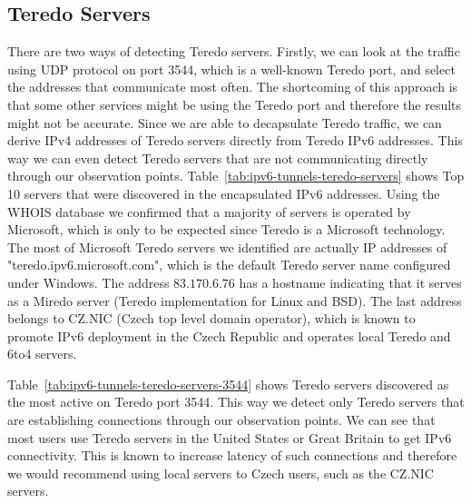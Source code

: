 \subsection{Teredo Servers}
There are two ways of detecting Teredo servers. Firstly, we can look at the traffic using UDP protocol on port 3544, which is a well-known Teredo port, and select the addresses that communicate most often. The shortcoming of this approach is that some other services might be using the Teredo port and therefore the results might not be accurate. Since we are able to decapsulate Teredo traffic, we can derive IPv4 addresses of Teredo servers directly from Teredo IPv6 addresses. This way we can even detect Teredo servers that are not communicating directly through our observation points. Table~\ref{tab:ipv6-tunnels-teredo-servers} shows Top 10 servers that were discovered in the encapsulated IPv6 addresses. Using the WHOIS database we confirmed that a majority of servers is operated by Microsoft, which is only to be expected since Teredo is a Microsoft technology. The most of Microsoft Teredo servers we identified are actually IP addresses of "teredo.ipv6.microsoft.com", which is the default Teredo server name configured under Windows. The address $83.170.6.76$ has a hostname indicating that it serves as a Miredo server (Teredo implementation for Linux and BSD). The last address belongs to CZ.NIC (Czech top level domain operator), which is known to promote IPv6 deployment in the Czech Republic and operates local Teredo and 6to4 servers.

Table~\ref{tab:ipv6-tunnels-teredo-servers-3544} shows Teredo servers discovered as the most active on Teredo port 3544. This way we detect only Teredo servers that are establishing connections through our observation points. We can see that most users use Teredo servers in the United States or Great Britain to get IPv6 connectivity. This is known to increase latency of such connections and therefore we would recommend using local servers to Czech users, such as the CZ.NIC servers.

